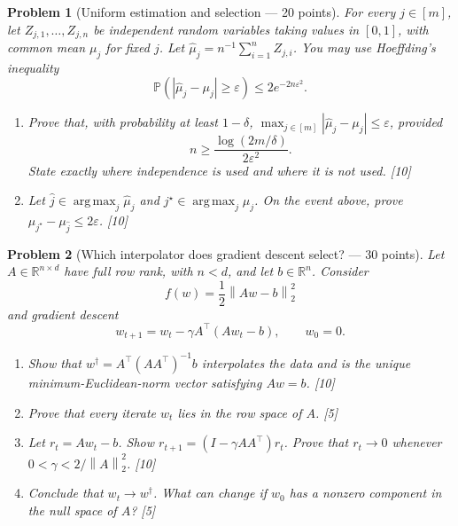 \documentclass[11pt]{article}
\newcommand{\R}{\mathbb{R}}
\newcommand{\Pp}{\mathbb{P}}
\newcommand{\norm}[1]{\left\lVert #1\right\rVert}
\DeclareMathOperator*{\argmax}{arg\,max}
\theoremstyle{courseproblem}
\newtheorem{problem}{Problem}
\begin{document}
\begin{problem}[Uniform estimation and selection --- 20 points]
For every $j\in[m]$, let $Z_{j,1},\ldots,Z_{j,n}$ be independent random
variables taking values in $[0,1]$, with common mean $\mu_j$ for fixed $j$.
Let $\widehat\mu_j=n^{-1}\sum_{i=1}^n Z_{j,i}$. You may use Hoeffding's
inequality
\[
\Pp\!\left(|\widehat\mu_j-\mu_j|\ge\varepsilon\right)
\le 2e^{-2n\varepsilon^2}.
\]
\begin{enumerate}[label=(\alph*)]
  \item Prove that, with probability at least $1-\delta$,
  $\max_{j\in[m]}|\widehat\mu_j-\mu_j|\le\varepsilon$, provided
  \[
  n\ge \frac{\log(2m/\delta)}{2\varepsilon^2}.
  \]
  State exactly where independence is used and where it is not used. \hfill [10]
  \item Let $\widehat j\in\argmax_j\widehat\mu_j$ and
  $j^\star\in\argmax_j\mu_j$. On the event above, prove
  $\mu_{j^\star}-\mu_{\widehat j}\le 2\varepsilon$. \hfill [10]
\end{enumerate}
\end{problem}

\begin{problem}[Which interpolator does gradient descent select? --- 30 points]
Let $A\in\R^{n\times d}$ have full row rank, with $n<d$, and let
$b\in\R^n$. Consider
\[
f(w)=\frac12\norm{Aw-b}_2^2
\]
and gradient descent
\[
w_{t+1}=w_t-\gamma A^\top(Aw_t-b),\qquad w_0=0.
\]
\begin{enumerate}[label=(\alph*)]
  \item Show that
  $w^\dagger=A^\top(AA^\top)^{-1}b$ interpolates the data and is the unique
  minimum-Euclidean-norm vector satisfying $Aw=b$. \hfill [10]
  \item Prove that every iterate $w_t$ lies in the row space of $A$. \hfill [5]
  \item Let $r_t=Aw_t-b$. Show
  $r_{t+1}=(I-\gamma AA^\top)r_t$. Prove that $r_t\to0$ whenever
  $0<\gamma<2/\norm{A}_2^2$. \hfill [10]
  \item Conclude that $w_t\to w^\dagger$. What can change if $w_0$ has a
  nonzero component in the null space of $A$? \hfill [5]
\end{enumerate}
\end{problem}
\end{document}
